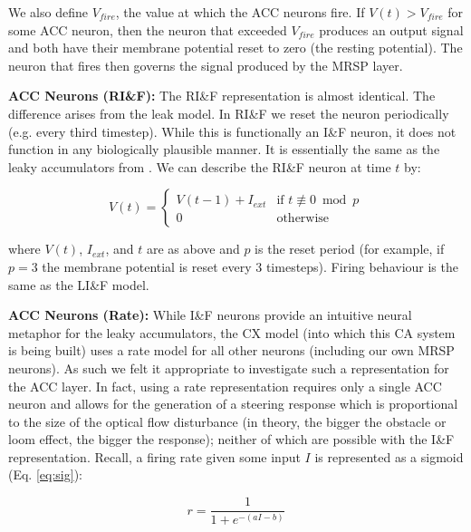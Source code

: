 \documentclass[a4paper,11pt,twoside,openright]{article}
\begin{document}
We also define $V_{fire}$, the value at which the ACC neurons fire.
If $V(t) > V_{fire}$ for some ACC neuron, then the neuron that exceeded
$V_{fire}$ produces an output signal and both have their membrane potential
reset to zero (the resting potential). The neuron that fires then governs the
signal produced by the MRSP layer.
\newline\par

\textbf{ACC Neurons (RI\&F):}
The RI\&F representation is almost identical. The difference arises from the leak
model. In RI\&F we reset the neuron periodically (e.g. every third timestep).
While this is functionally an I\&F neuron, it does not function in any
biologically plausible manner. It is essentially the same as the leaky
accumulators from \cite{Mitchell2018}. We can describe the RI\&F neuron at time
$t$ by:

\begin{equation}
  V(t) =
  \begin{cases}
    V(t-1) + I_{ext} & \text{if } t \not\equiv 0 \bmod p \\
    0 & \text{otherwise}
  \end{cases}
\end{equation}

where $V(t)$, $I_{ext}$, and $t$ are as above and $p$ is the reset period (for
example, if $p = 3$ the membrane potential is reset every 3 timesteps). Firing
behaviour is the same as the LI\&F model.
\newline\par

\textbf{ACC Neurons (Rate):}
While I\&F neurons provide an intuitive neural metaphor for the leaky
accumulators, the CX model (into which this CA system is being built) uses
a rate model for all other neurons (including our own MRSP neurons). As such we
felt it appropriate to investigate such a representation for the ACC layer. In
fact, using a rate representation requires only a single ACC neuron and allows
for the generation of a steering response which is proportional to the size of
the optical flow disturbance (in theory, the bigger the obstacle or loom effect,
the bigger the response); neither of which are possible with the I\&F
representation. Recall, a firing rate given some input $I$ is represented as a
sigmoid (Eq. \ref{eq:sig}):

\begin{equation*}
r = \frac{1}{1 + e^{-(aI - b)}}
\end{equation*}
\end{document}
